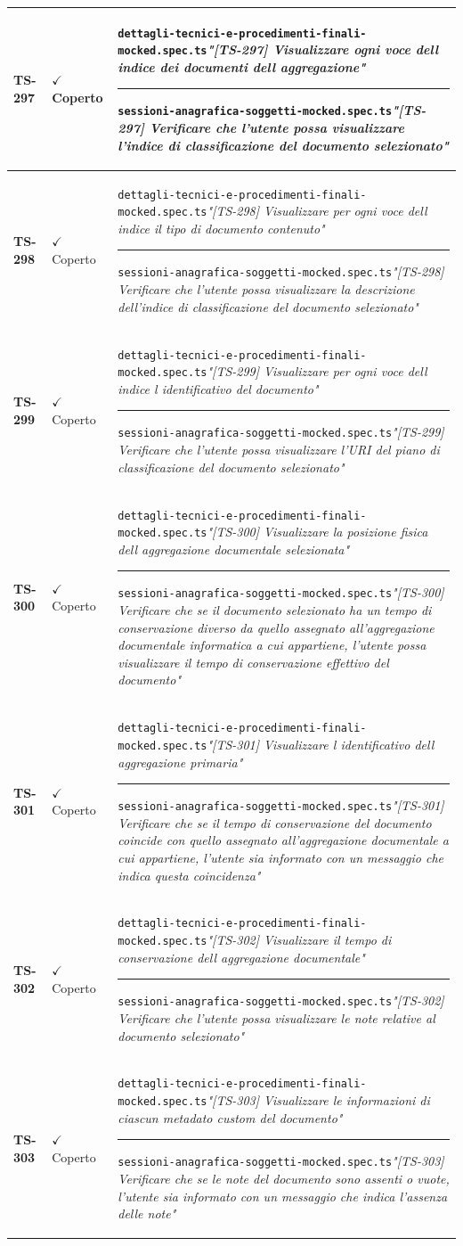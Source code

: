 \documentclass[a4paper,12pt]{article}
\newcommand{\ok}{\textcolor{green!60!black}{$\checkmark$ Coperto}}
\newcommand{\f}[1]{\nolinkurl{#1}\newline}
\newcommand{\q}[1]{\textit{#1}}
\newcommand{\sep}{\newline \vspace{2mm} \hrule \vspace{2mm}}
\begin{document}
\begin{longtable}{|p{1.5cm}|p{3.0cm}|p{10.5cm}|}
\textbf{TS-297} & \ok & \f{dettagli-tecnici-e-procedimenti-finali-mocked.spec.ts}\q{"[TS-297] Visualizzare ogni voce dell indice dei documenti dell aggregazione"} \sep \f{sessioni-anagrafica-soggetti-mocked.spec.ts}\q{"[TS-297] Verificare che l'utente possa visualizzare l'indice di classificazione del documento selezionato"} \\ \hline
\textbf{TS-298} & \ok & \f{dettagli-tecnici-e-procedimenti-finali-mocked.spec.ts}\q{"[TS-298] Visualizzare per ogni voce dell indice il tipo di documento contenuto"} \sep \f{sessioni-anagrafica-soggetti-mocked.spec.ts}\q{"[TS-298] Verificare che l'utente possa visualizzare la descrizione dell'indice di classificazione del documento selezionato"} \\ \hline
\textbf{TS-299} & \ok & \f{dettagli-tecnici-e-procedimenti-finali-mocked.spec.ts}\q{"[TS-299] Visualizzare per ogni voce dell indice l identificativo del documento"} \sep \f{sessioni-anagrafica-soggetti-mocked.spec.ts}\q{"[TS-299] Verificare che l'utente possa visualizzare l'URI del piano di classificazione del documento selezionato"} \\ \hline
\textbf{TS-300} & \ok & \f{dettagli-tecnici-e-procedimenti-finali-mocked.spec.ts}\q{"[TS-300] Visualizzare la posizione fisica dell aggregazione documentale selezionata"} \sep \f{sessioni-anagrafica-soggetti-mocked.spec.ts}\q{"[TS-300] Verificare che se il documento selezionato ha un tempo di conservazione diverso da quello assegnato all'aggregazione documentale informatica a cui appartiene, l'utente possa visualizzare il tempo di conservazione effettivo del documento"} \\ \hline
\textbf{TS-301} & \ok & \f{dettagli-tecnici-e-procedimenti-finali-mocked.spec.ts}\q{"[TS-301] Visualizzare l identificativo dell aggregazione primaria"} \sep \f{sessioni-anagrafica-soggetti-mocked.spec.ts}\q{"[TS-301] Verificare che se il tempo di conservazione del documento coincide con quello assegnato all'aggregazione documentale a cui appartiene, l'utente sia informato con un messaggio che indica questa coincidenza"} \\ \hline
\textbf{TS-302} & \ok & \f{dettagli-tecnici-e-procedimenti-finali-mocked.spec.ts}\q{"[TS-302] Visualizzare il tempo di conservazione dell aggregazione documentale"} \sep \f{sessioni-anagrafica-soggetti-mocked.spec.ts}\q{"[TS-302] Verificare che l'utente possa visualizzare le note relative al documento selezionato"} \\ \hline
\textbf{TS-303} & \ok & \f{dettagli-tecnici-e-procedimenti-finali-mocked.spec.ts}\q{"[TS-303] Visualizzare le informazioni di ciascun metadato custom del documento"} \sep \f{sessioni-anagrafica-soggetti-mocked.spec.ts}\q{"[TS-303] Verificare che se le note del documento sono assenti o vuote, l'utente sia informato con un messaggio che indica l'assenza delle note"} \\ \hline

\end{longtable}
\end{document}
